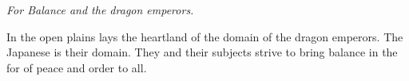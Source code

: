 \section{}\label{ch:Tribes:Japanses}

\begin{flushright}
	\emph{For Balance and the dragon emperors.}
\end{flushright}

In the open plains lays the heartland of the domain of the dragon emperors.
The \gls{Japanese} is their domain.
They and their subjects strive to bring balance in the for of peace and order to all.











%
%